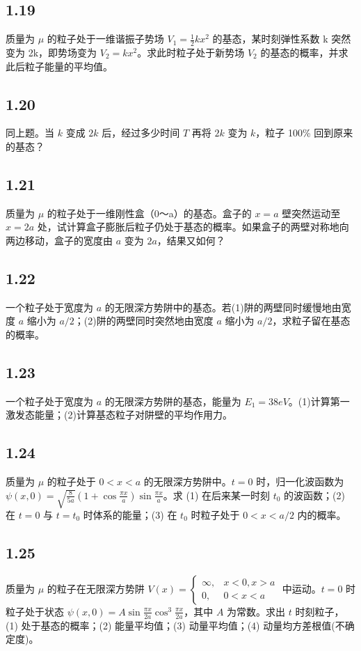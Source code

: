 \subsection{1.19}
质量为 $\mu$ 的粒子处于一维谐振子势场 $V_1 = \frac{1}{2}kx^2$ 的基态，某时刻弹性系数 k 突然变为 2k，即势场变为 $V_2 = kx^2$。求此时粒子处于新势场 $V_2$ 的基态的概率，并求此后粒子能量的平均值。

\subsection{1.20}
同上题。当 $k$ 变成 $2k$ 后，经过多少时间 $T$ 再将 $2k$ 变为 $k$，粒子 100\% 回到原来的基态？

\subsection{1.21}
质量为 $\mu$ 的粒子处于一维刚性盒（0～a）的基态。盒子的 $x=a$ 壁突然运动至 $x=2a$ 处，试计算盒子膨胀后粒子仍处于基态的概率。如果盒子的两壁对称地向两边移动，盒子的宽度由 $a$ 变为 $2a$，结果又如何？

\subsection{1.22}
一个粒子处于宽度为 $a$ 的无限深方势阱中的基态。若(1)阱的两壁同时缓慢地由宽度 $a$ 缩小为 $a/2$；(2)阱的两壁同时突然地由宽度 $a$ 缩小为 $a/2$，求粒子留在基态的概率。

\subsection{1.23}
一个粒子处于宽度为 $a$ 的无限深方势阱的基态，能量为 $E_1 = 38eV$。(1)计算第一激发态能量；(2)计算基态粒子对阱壁的平均作用力。

\subsection{1.24}
质量为 $\mu$ 的粒子处于 $0 < x < a$ 的无限深方势阱中。$t = 0$ 时，归一化波函数为 $\psi(x, 0) = \sqrt{\frac{8}{5a}} \left( 1 + \cos \frac{\pi x}{a} \right) \sin \frac{\pi x}{a}$。求 (1) 在后来某一时刻 $t_0$ 的波函数；(2) 在 $t = 0$ 与 $t = t_0$ 时体系的能量；(3) 在 $t_0$ 时粒子处于 $0 < x < a/2$ 内的概率。

\subsection{1.25}
质量为 $\mu$ 的粒子在无限深方势阱 $V(x) = \begin{cases}
\infty, & x < 0, x > a \\
0, & 0 < x < a
\end{cases}$ 中运动。$t = 0$ 时粒子处于状态 $\psi(x, 0) = A \sin \frac{\pi x}{2a} \cos^3 \frac{\pi x}{2a}$，其中 $A$ 为常数。求出 $t$ 时刻粒子，(1) 处于基态的概率；(2) 能量平均值；(3) 动量平均值；(4) 动量均方差根值(不确定度)。

